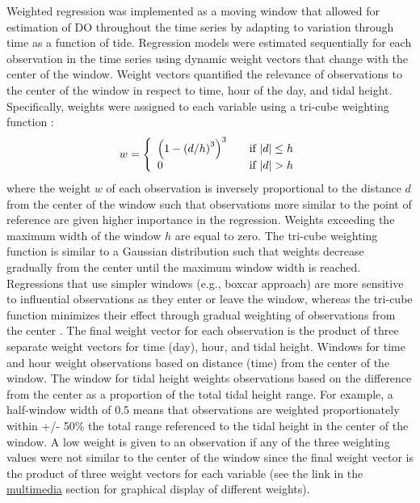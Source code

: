 \documentclass[letterpaper,12pt,oneside]{article}\usepackage[]{graphicx}\usepackage[]{color}
\begin{document}
Weighted regression was implemented as a moving window that allowed for estimation of \ac{DO} throughout the time series by adapting to variation through time as a function of tide. Regression models were estimated sequentially for each observation in the time series using dynamic weight vectors that change with the center of the window.  Weight vectors quantified the relevance of observations to the center of the window in respect to time, hour of the day, and tidal height.  Specifically, weights were assigned to each variable using a tri-cube weighting function \citep{Tukey77,Hirsch10}:
\begin{equation}
w= \left\{ 
  \begin{array}{l l}
    \left(1-\left(d/h\right)^3\right)^3 & \quad \textrm{if } |d| \leq h \\
    0 & \quad \textrm{if } |d| > h 
  \end{array} \right.
\end{equation}
where the weight $w$ of each observation is inversely proportional to the distance $d$ from the center of the window such that observations more similar to the point of reference are given higher importance in the regression.  Weights exceeding the maximum width of the window $h$ are equal to zero.  The tri-cube weighting function is similar to a Gaussian distribution such that weights decrease gradually from the center until the maximum window width is reached.  Regressions that use simpler windows (e.g., boxcar approach) are  more sensitive to influential observations as they enter or leave the window, whereas the tri-cube function minimizes their effect through gradual weighting of observations from the center \citep{Hirsch10}.  The final weight vector for each observation is the product of three separate weight vectors for time (day), hour, and tidal height. Windows for time and hour weight observations based on distance (time) from the center of the window.  The window for tidal height weights observations based on the difference from the center as a proportion of the total tidal height range.  For example, a half-window width of 0.5 means that observations are weighted proportionately within +/- 50\% the total range referenced to the tidal height in the center of the window. A low weight is given to an observation if any of the three weighting values were not similar to the center of the window since the final weight vector is the product of three weight vectors for each variable (see the link in the \hyperref[multi]{multimedia} section for graphical display of different weights).    
\end{document}

